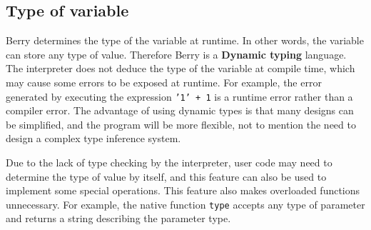 \subsection {Type of variable}

Berry determines the type of the variable at runtime. In other words, the variable can store any type of value. Therefore Berry is a \textbf{Dynamic typing} language. The interpreter does not deduce the type of the variable at compile time, which may cause some errors to be exposed at runtime. For example, the error generated by executing the expression \texttt{'1' + 1} is a runtime error rather than a compiler error. The advantage of using dynamic types is that many designs can be simplified, and the program will be more flexible, not to mention the need to design a complex type inference system.

Due to the lack of type checking by the interpreter, user code may need to determine the type of value by itself, and this feature can also be used to implement some special operations. This feature also makes overloaded functions unnecessary. For example, the native function \texttt{type} accepts any type of parameter and returns a string describing the parameter type.
